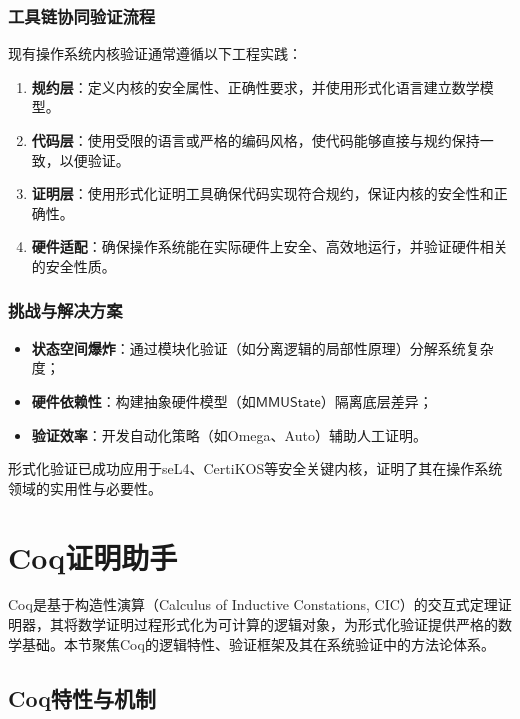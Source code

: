 \subsubsection{工具链协同验证流程}
现有操作系统内核验证通常遵循以下工程实践：
\begin{enumerate}
    \item \textbf{规约层}：定义内核的安全属性、正确性要求，并使用形式化语言建立数学模型。
    \item \textbf{代码层}：使用受限的语言或严格的编码风格，使代码能够直接与规约保持一致，以便验证。
    \item \textbf{证明层}：使用形式化证明工具确保代码实现符合规约，保证内核的安全性和正确性。
    \item \textbf{硬件适配}：确保操作系统能在实际硬件上安全、高效地运行，并验证硬件相关的安全性质。
\end{enumerate}

\subsubsection{挑战与解决方案}
\begin{itemize}
    \item \textbf{状态空间爆炸}：通过模块化验证（如分离逻辑的局部性原理）分解系统复杂度；
    \item \textbf{硬件依赖性}：构建抽象硬件模型（如$\mathsf{MMUState}$）隔离底层差异；
    \item \textbf{验证效率}：开发自动化策略（如Omega、Auto）辅助人工证明。
\end{itemize}

形式化验证已成功应用于seL4、CertiKOS等安全关键内核，证明了其在操作系统领域的实用性与必要性。
\section{Coq证明助手}
\label{sec:coq-proof-assistant}

Coq是基于构造性演算（Calculus of Inductive Constations, CIC）的交互式定理证明器，其将数学证明过程形式化为可计算的逻辑对象，为形式化验证提供严格的数学基础。本节聚焦Coq的逻辑特性、验证框架及其在系统验证中的方法论体系。

\subsection{Coq特性与机制}
\label{subsec:coq-features}

